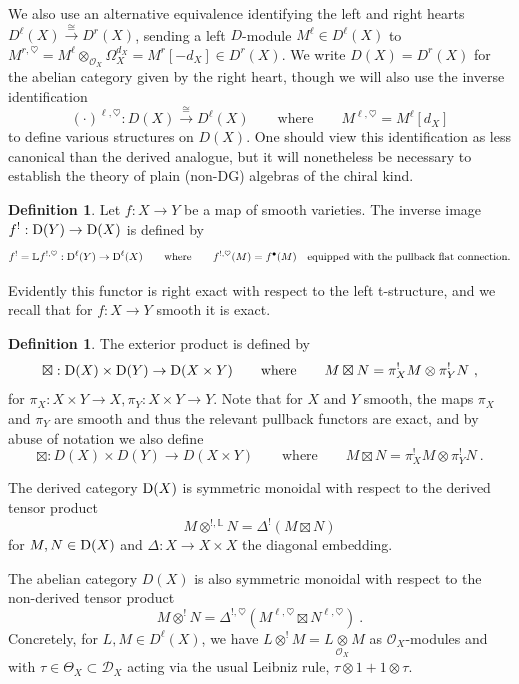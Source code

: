 \documentclass[11pt]{amsart}
\numberwithin{equation}{section}
\theoremstyle{definition}
\newtheorem{defn}[theo]{Definition}
\newcommand{\bb}{\mathbb}
\newcommand{\mc}{\mathcal}
\newcommand{\D}{{\mathcal{D}}}
\newcommand{\0}{{\textbf{0}}}
\newcommand{\Dd}{{\textup{D}}}
\newcommand{\DD}{{D}}
\def\OO{{\mc O}}
\newcommand{\tensor}[1]{\underset{#1}{\otimes}}
\begin{document}
We also use an alternative equivalence identifying the left and right hearts $\DD^\ell(X) \xrightarrow{\cong} \DD^r(X)$, sending a left $D$-module $M^\ell\in \DD^\ell(X)$ to $M^{r,\heartsuit}=M^\ell\otimes_{\mc O_X} \Omega^{d_X}_X=M^r[-d_X] \in \DD^r(X)$. We write $\DD(X)=\DD^r(X)$ for the abelian category given by the right heart, though we will also use the inverse identification
\[ (\cdot )^{\ell,\heartsuit}:\DD(X) \xrightarrow{\cong} \DD^\ell(X) \qquad\text{where}\qquad M^{\ell,\heartsuit} = M^\ell[d_X] \]
to define various structures on $\DD(X)$.
One should view this identification as less canonical than the derived analogue, but it will nonetheless be necessary to establish the theory of plain (non-DG) algebras of the chiral kind.


\begin{defn}\label{Dmodinvim}
	Let $f:X\to Y$ be a map of smooth varieties. The inverse image $f^!:\Dd(Y)\to \Dd(X)$ is defined by
	\[ f^!=\bb L f^{!,\heartsuit}:\Dd^\ell(Y)\to \Dd^\ell(X)   \qquad\text{where}\qquad f^{!,\heartsuit}(M)=f^\bullet(M) \quad\text{equipped with the pullback flat connection.} \]
\end{defn}

Evidently this functor is right exact with respect to the left t-structure, and we recall that for $f:X\to Y$ smooth it is exact.


\begin{defn}
	The exterior product is defined by
	\[ \boxtimes:\Dd(X)\times \Dd(Y)\to \Dd(X\times Y) \qquad\text{where}\qquad M\boxtimes N = \pi_X^!M \otimes \pi_Y^!N \ , \]
	for $\pi_X:X\times Y\to X, \pi_Y:X\times Y\to Y$. Note that for $X$ and $Y$ smooth, the maps $\pi_X$ and $\pi_Y$ are smooth and thus the relevant pullback functors are exact, and by abuse of notation we also define
		\[ \boxtimes:\DD(X)\times \DD(Y)\to \DD(X\times Y) \qquad\text{where}\qquad M\boxtimes N = \pi_X^!M \otimes \pi_Y^!N \ . \]
\end{defn}

The derived category $\Dd(X)$ is symmetric monoidal with respect to the derived tensor product
$$M\otimes^{!, \bb L} N= \Delta^!(M\boxtimes N) $$
for $M,N\in \Dd(X)$ and $\Delta:X\to X\times X$ the diagonal embedding.

The abelian category $\DD(X)$ is also symmetric monoidal with respect to the non-derived tensor product
$$M\otimes^{!} N= \Delta^{!,\heartsuit}(M^{\ell,\heartsuit}\boxtimes N^{\ell,\heartsuit})  \ .$$
Concretely, for $L,M\in \DD^\ell(X)$, we have $L\otimes^!M = L\tensor{\OO_X}M$
as $\OO_X$-modules and with $\tau\in \Theta_X\subset \D_X$ acting via the usual Leibniz rule, $\tau\otimes1+1\otimes\tau$.
\end{document}
